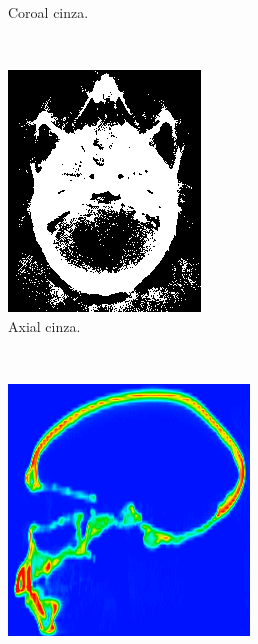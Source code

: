 \documentclass{article}
\begin{document}
\begin{figure}[h]
\begin{subfigure}[b]{0.3\textwidth}
        \caption{Coroal cinza.}
    \end{subfigure}
    ~
    \begin{subfigure}[b]{0.3\textwidth}
        \includegraphics[width=\textwidth]{skull/radiologist-axial-gray.png}
        \caption{Axial cinza.}
    \end{subfigure}
    ~
    \begin{subfigure}[b]{0.3\textwidth}
        \includegraphics[width=\textwidth]{skull/radiologist-sagital.png}

\end{subfigure}
\end{figure}
\end{document}
